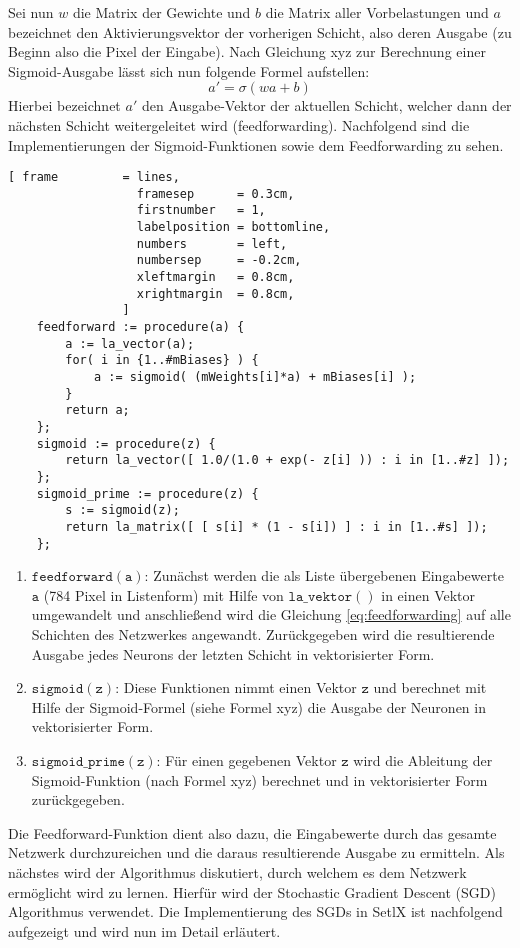 \noindent
Sei nun $w$ die Matrix der Gewichte und $b$ die Matrix aller Vorbelastungen und $a$ bezeichnet den Aktivierungsvektor der vorherigen Schicht, also deren Ausgabe (zu Beginn also die Pixel der Eingabe). Nach Gleichung xyz zur Berechnung einer Sigmoid-Ausgabe lässt sich nun folgende Formel aufstellen: 
\begin{equation}\label{eq:feedforwarding}
	a' = \sigma(wa + b)
\end{equation}
\noindent
Hierbei bezeichnet $a'$ den Ausgabe-Vektor der aktuellen Schicht, welcher dann der nächsten Schicht weitergeleitet wird (feedforwarding). Nachfolgend sind die Implementierungen der Sigmoid-Funktionen sowie dem Feedforwarding zu sehen.
\begin{Verbatim}[ frame         = lines, 
                  framesep      = 0.3cm, 
                  firstnumber   = 1,
                  labelposition = bottomline,
                  numbers       = left,
                  numbersep     = -0.2cm,
                  xleftmargin   = 0.8cm,
                  xrightmargin  = 0.8cm,
                ]
    feedforward := procedure(a) {
        a := la_vector(a);	
        for( i in {1..#mBiases} ) { 
            a := sigmoid( (mWeights[i]*a) + mBiases[i] );
        }
        return a;
    };                            
    sigmoid := procedure(z) {
        return la_vector([ 1.0/(1.0 + exp(- z[i] )) : i in [1..#z] ]);
    };
    sigmoid_prime := procedure(z) {
        s := sigmoid(z); 
        return la_matrix([ [ s[i] * (1 - s[i]) ] : i in [1..#s] ]);
    };
\end{Verbatim}
\begin{enumerate}
\item $\mathtt{feedforward(a)}$: Zunächst werden die als Liste übergebenen Eingabewerte $\mathtt{a}$ (784 Pixel in Listenform) mit Hilfe von $\mathtt{la\_vektor()}$ in einen Vektor umgewandelt und anschließend wird die Gleichung \eqref{eq:feedforwarding} auf alle Schichten des Netzwerkes angewandt. Zurückgegeben wird die resultierende Ausgabe jedes Neurons der letzten Schicht in vektorisierter Form.
\item $\mathtt{sigmoid(z)}$: Diese Funktionen nimmt einen Vektor $\mathtt{z}$ und berechnet mit Hilfe der Sigmoid-Formel (siehe Formel xyz) die Ausgabe der Neuronen in vektorisierter Form.
\item $\mathtt{sigmoid\_prime(z)}$: Für einen gegebenen Vektor $\mathtt{z}$ wird die Ableitung der Sigmoid-Funktion (nach Formel xyz) berechnet und in vektorisierter Form zurückgegeben.
\end{enumerate}
\noindent
Die Feedforward-Funktion dient also dazu, die Eingabewerte durch das gesamte Netzwerk durchzureichen und die daraus resultierende Ausgabe zu ermitteln. Als nächstes wird der Algorithmus diskutiert, durch welchem es dem Netzwerk ermöglicht wird zu \glqq lernen\grqq. Hierfür wird der Stochastic Gradient Descent (SGD) Algorithmus verwendet. Die Implementierung des SGDs in SetlX ist nachfolgend aufgezeigt und wird nun im Detail erläutert.

